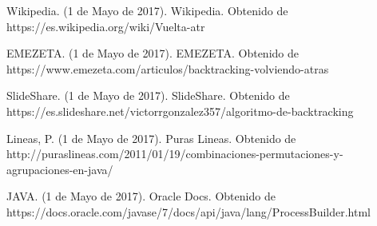 \documentclass[conference]{IEEEtran}
\begin{document}
%
%
%
\begin{thebibliography}{1}

Wikipedia. (1 de Mayo de 2017). Wikipedia. Obtenido de https://es.wikipedia.org/wiki/Vuelta-atr%


EMEZETA. (1 de Mayo de 2017). EMEZETA. Obtenido de https://www.emezeta.com/articulos/backtracking-volviendo-atras


SlideShare. (1 de Mayo de 2017). SlideShare. Obtenido de https://es.slideshare.net/victorrgonzalez357/algoritmo-de-backtracking

Lineas, P. (1 de Mayo de 2017). Puras Lineas. Obtenido de http://puraslineas.com/2011/01/19/combinaciones-permutaciones-y-agrupaciones-en-java/

JAVA. (1 de Mayo de 2017). Oracle Docs. Obtenido de https://docs.oracle.com/javase/7/docs/api/java/lang/ProcessBuilder.html

\end{thebibliography}






\end{document}
